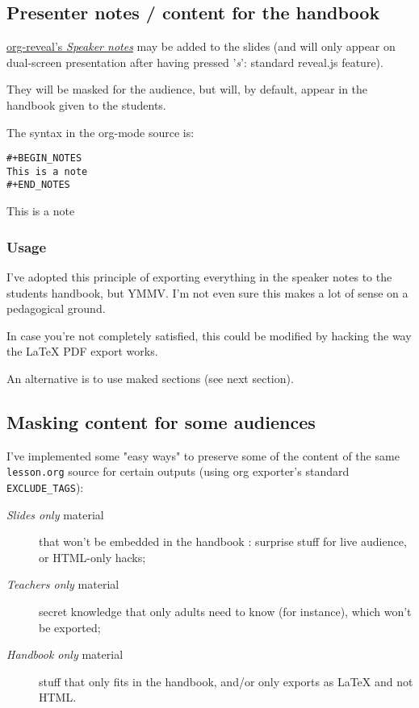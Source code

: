 \documentclass[a4paper]{article}
\newenvironment{NOTES}{\begin{lrbox}{\mybox}\begin{minipage}{0.9\textwidth}\begin{shaded}}{\end{shaded}\end{minipage}\end{lrbox}\fbox{\usebox{\mybox}}}
\begin{document}
\subsection{Presenter notes / content for the handbook}
\label{sec:org83999e2}

\href{https://github.com/yjwen/org-reveal/\#speaker-notes}{org-reveal's \emph{Speaker notes}} may be added to the slides (and will only appear on
dual-screen presentation after having pressed '\emph{s}': standard reveal.js
feature).

They will be masked for the audience, but will, by default, appear in the handbook given to the students.

The syntax in the org-mode source is:
\begin{verbatim}
#+BEGIN_NOTES
This is a note
#+END_NOTES
\end{verbatim}

\begin{NOTES}
This is a note
\end{NOTES}

\subsubsection{Usage}
\label{sec:org37f70ca}

I've adopted this principle of exporting everything in the speaker
notes to the students handbook, but YMMV. I'm not even sure this makes
a lot of sense on a pedagogical ground.

In case you're not completely satisfied, this could be modified by
hacking the way the \LaTeX{} PDF export works.

An alternative is to use maked sections (see next section).

\subsection{Masking content for some audiences}
\label{sec:org850ffd3}

I've implemented some "easy ways" to preserve some of the content of the same \texttt{lesson.org} source for certain outputs (using org exporter's standard \texttt{EXCLUDE\_TAGS}):

\begin{description}
\item[{\emph{Slides only} material}] that won't be embedded in the handbook : surprise stuff for live audience, or HTML-only hacks;
\item[{\emph{Teachers only} material}] secret knowledge that only adults need
to know (for instance), which won't be exported;
\end{description}
\begin{description}
\item[{\emph{Handbook only} material}] stuff that only fits in the handbook, and/or only exports as \LaTeX{} and not HTML.
\end{description}
\end{document}
